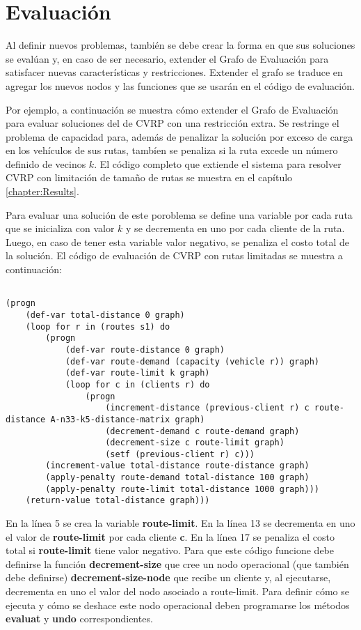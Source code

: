 \section{Evaluación}\label{4-eval}

Al definir nuevos problemas, también se debe crear la forma en que sus soluciones se evalúan y, en caso de ser necesario, extender el Grafo de Evaluación para satisfacer nuevas características y restricciones. Extender el grafo se traduce en agregar los nuevos nodos y las funciones que se usarán en el código de evaluación.

Por ejemplo, a continuación se muestra cómo extender el Grafo de Evaluación para evaluar soluciones del de CVRP con una restricción extra. Se restringe el problema de capacidad para, además de penalizar la solución por exceso de carga en los vehículos de sus rutas, tambíen se penaliza si la ruta excede un número definido de vecinos $k$. El código completo que extiende el sistema para resolver CVRP con limitación de tamaño de rutas se muestra en el capítulo \ref{chapter:Results}.

Para evaluar una solución de este poroblema se define una variable por cada ruta que se inicializa con valor $k$ y se decrementa en uno por cada cliente de la ruta. Luego, en caso de tener esta variable valor negativo, se penaliza el costo total de la solución. El código de evaluación de CVRP con rutas limitadas se muestra a continuación:

\begin{lstlisting}

(progn
	(def-var total-distance 0 graph)
	(loop for r in (routes s1) do 
		(progn
			(def-var route-distance 0 graph)
			(def-var route-demand (capacity (vehicle r)) graph) 
			(def-var route-limit k graph)
			(loop for c in (clients r) do 
				(progn
					(increment-distance (previous-client r) c route-distance A-n33-k5-distance-matrix graph)
					(decrement-demand c route-demand graph) 
					(decrement-size c route-limit graph) 
					(setf (previous-client r) c)))
		(increment-value total-distance route-distance graph)
		(apply-penalty route-demand total-distance 100 graph) 
		(apply-penalty route-limit total-distance 1000 graph))) 
	(return-value total-distance graph)))
\end{lstlisting}

En la línea 5 se crea la variable \textbf{route-limit}. En la línea 13 se decrementa en uno el valor de \textbf{route-limit} por cada cliente \textbf{c}. En la línea 17 se penaliza el costo total si \textbf{route-limit} tiene valor negativo. Para que este código funcione debe definirse la función \textbf{decrement-size} que cree un nodo operacional (que también debe definirse) \textbf{decrement-size-node} que recibe un cliente y, al ejecutarse, decrementa en uno el valor del nodo asociado a route-limit. Para definir cómo se ejecuta y cómo se deshace este nodo operacional deben programarse los métodos \textbf{evaluat} y \textbf{undo} correspondientes.

